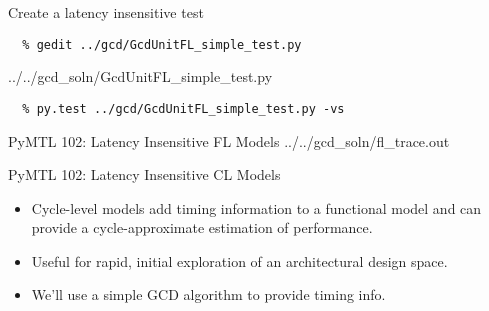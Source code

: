\begin{task}\begin{frame}[fragile]{Create a latency insensitive test}

\vspace{-0.15in}
\begin{Verbatim}[commandchars=\\\{\}]
  % cd \midtilde/pymtl-tut/build
  % gedit ../gcd/GcdUnitFL_simple_test.py
\end{Verbatim}
\vspace{-0.2in}

%
{../../gcd_soln/GcdUnitFL_simple_test.py}

\vspace{-0.22in}
\begin{verbatim}
  % py.test ../gcd/GcdUnitFL_simple_test.py -vs
\end{verbatim}
\end{frame}
\end{task}

\begin{frame}{PyMTL 102: Latency Insensitive FL Models}
\vspace{-0.25in}
%
{../../gcd_soln/fl_trace.out}

\end{frame}

\begin{frame}{PyMTL 102: Latency Insensitive CL Models}

\begin{itemize}
  \item Cycle-level models add timing information to a functional model
        and can provide a cycle-approximate estimation of performance.
  \smallskip
  \item Useful for rapid, initial exploration of an
        architectural design space.
  \smallskip
  \item We'll use a simple GCD algorithm to provide timing info.
\end{itemize}

\end{frame}

